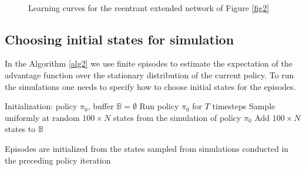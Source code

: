 \documentclass[11pt]{article}
\theoremstyle{definition}
\numberwithin{equation}{section}
\begin{document}
\begin{figure}[H]
     \\


\caption{Learning curves for the reentrant extended network of Figure \ref{fig2}}
     \label{fig:reent_ac}
   \end{figure}
   
   \subsection{Choosing initial states for simulation}

In the Algorithm \ref{alg2} we use finite episodes to estimate the expectation of the advantage function over the stationary distribution of the current policy. To run the simulations one needs to specify how to choose initial states for the episodes.

\begin{algorithm}[h]
\SetAlgoLined
{}
 Initialization: policy $\pi_{0}$,  buffer $\mathbb{B}=\emptyset$\;
 Run policy $\pi_{0}$ for $T$ timesteps\;
 Sample uniformly at random $100\times N$ states from the simulation of policy $\pi_{0}$\;
 Add $100\times N$ states to $\mathbb{B}$\;

 \caption{Episodes are initialized from the states sampled from simulations conducted in the preceding policy iteration}\label{alg3}
\end{algorithm}
\end{document}
